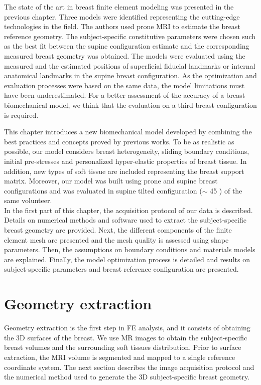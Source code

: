 
The state of the art in breast finite element modeling was presented in the previous chapter. Three models were identified representing the cutting-edge technologies in the field. The authors used prone MRI to estimate the breast reference geometry. The subject-specific constitutive parameters were chosen such as the best fit between the supine configuration estimate and the corresponding measured breast geometry was obtained. The models were evaluated using the measured and the estimated positions of superficial fiducial landmarks or internal anatomical landmarks in the supine breast configuration. As the optimization and evaluation  processes were based on the same data, the model limitations must have been underestimated. For a better assessment of the accuracy of a breast biomechanical model, we think that the evaluation on a third breast configuration is required.

 This chapter introduces a new biomechanical model developed by combining the best practices and concepts proved by previous works. To be as realistic as possible, our model considers breast heterogeneity, sliding boundary conditions, initial pre-stresses and personalized hyper-elastic properties of breast tissue. In addition, new types of soft tissue are included representing the breast support matrix. Moreover, our model was built using prone and supine breast configurations and was evaluated in supine tilted configuration ($\sim$ 45 \textdegree) of the same volunteer.\\
 

In the first part of this chapter, the acquisition protocol of our data is described. Details on numerical methods and software used to extract the subject-specific breast geometry are provided. Next, the different components of the finite element mesh are presented and the mesh quality is assessed using shape parameters.  Then, the assumptions on boundary conditions and materials models are explained. Finally, the model optimization process is detailed and results on subject-specific parameters and breast reference configuration are presented.   
\clearpage
\section{Geometry extraction}\label{section:geometryextraction}

Geometry extraction is the first step in FE analysis, and it consists of obtaining the 3D surfaces of the
breast. We use MR images to obtain the subject-specific breast volumes and the surrounding soft tissues distribution. Prior to surface extraction, the MRI volume is segmented and mapped to a single reference coordinate system. The next section describes the image acquisition protocol and the numerical method used to generate the 3D subject-specific breast geometry.

